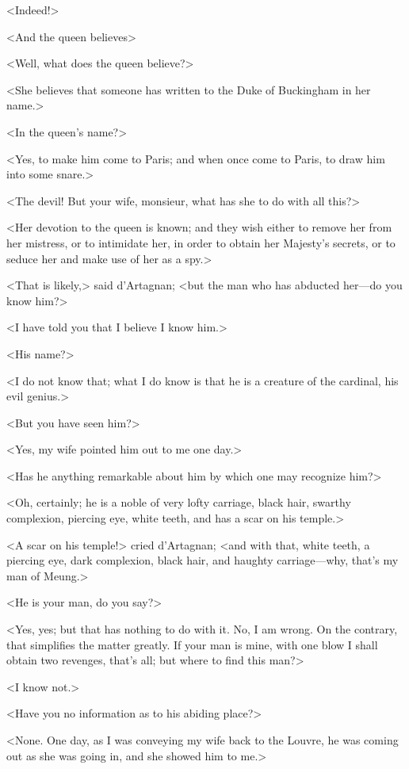 <Indeed!> 

<And the queen believes\longdash> 

<Well, what does the queen believe?> 

<She believes that someone has written to the Duke of Buckingham in her name.> 

<In the queen's name?> 

<Yes, to make him come to Paris; and when once come to Paris, to draw him into some snare.> 

<The devil! But your wife, monsieur, what has she to do with all this?> 

<Her devotion to the queen is known; and they wish either to remove her from her mistress, or to intimidate her, in order to obtain her Majesty's secrets, or to seduce her and make use of her as a spy.> 

<That is likely,> said d'Artagnan; <but the man who has abducted her---do you know him?> 

<I have told you that I believe I know him.> 

<His name?> 

<I do not know that; what I do know is that he is a creature of the cardinal, his evil genius.> 

<But you have seen him?> 

<Yes, my wife pointed him out to me one day.> 

<Has he anything remarkable about him by which one may recognize him?> 

<Oh, certainly; he is a noble of very lofty carriage, black hair, swarthy complexion, piercing eye, white teeth, and has a scar on his temple.> 

<A scar on his temple!> cried d'Artagnan; <and with that, white teeth, a piercing eye, dark complexion, black hair, and haughty carriage---why, that's my man of Meung.> 

<He is your man, do you say?> 

<Yes, yes; but that has nothing to do with it. No, I am wrong. On the contrary, that simplifies the matter greatly. If your man is mine, with one blow I shall obtain two revenges, that's all; but where to find this man?> 

<I know not.> 

<Have you no information as to his abiding place?> 

<None. One day, as I was conveying my wife back to the Louvre, he was coming out as she was going in, and she showed him to me.> 

